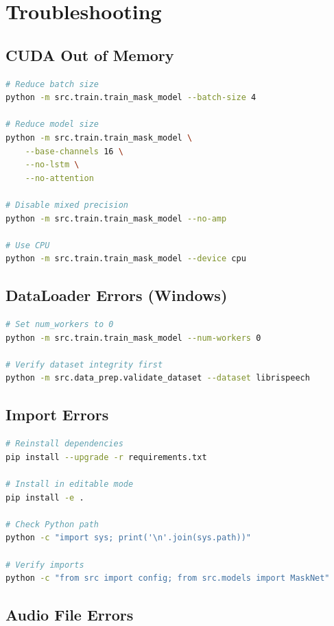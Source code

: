\documentclass[12pt,a4paper]{article}
\begin{document}
\section{Troubleshooting}

\subsection{CUDA Out of Memory}

\begin{lstlisting}[language=bash]
# Reduce batch size
python -m src.train.train_mask_model --batch-size 4

# Reduce model size
python -m src.train.train_mask_model \
    --base-channels 16 \
    --no-lstm \
    --no-attention

# Disable mixed precision
python -m src.train.train_mask_model --no-amp

# Use CPU
python -m src.train.train_mask_model --device cpu
\end{lstlisting}

\subsection{DataLoader Errors (Windows)}

\begin{lstlisting}[language=bash]
# Set num_workers to 0
python -m src.train.train_mask_model --num-workers 0

# Verify dataset integrity first
python -m src.data_prep.validate_dataset --dataset librispeech
\end{lstlisting}

\subsection{Import Errors}

\begin{lstlisting}[language=bash]
# Reinstall dependencies
pip install --upgrade -r requirements.txt

# Install in editable mode
pip install -e .

# Check Python path
python -c "import sys; print('\n'.join(sys.path))"

# Verify imports
python -c "from src import config; from src.models import MaskNet"
\end{lstlisting}

\subsection{Audio File Errors}
\end{document}
